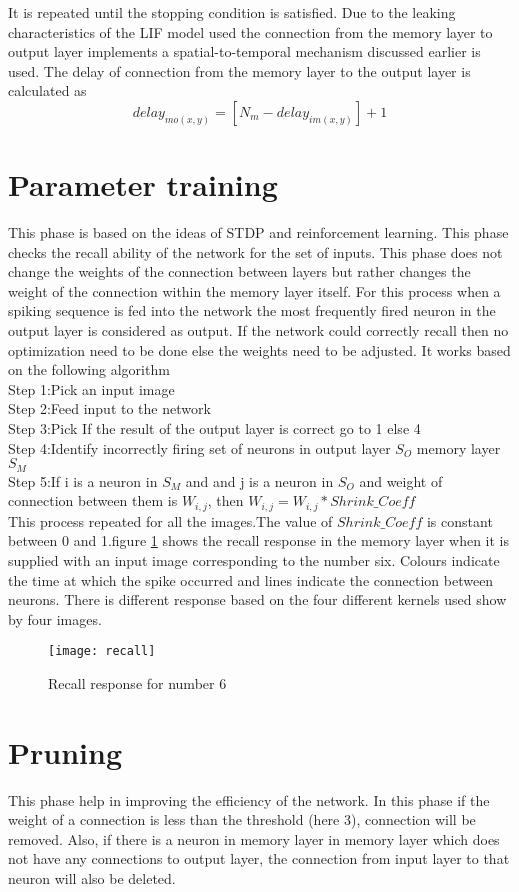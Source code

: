 It is repeated until the stopping condition is satisfied. Due to the leaking
characteristics of the LIF model used the connection from the memory layer to
output layer implements a spatial-to-temporal mechanism discussed earlier is
used. The delay of connection from the memory layer to the output layer is
calculated as
\begin{equation*}
    delay_{mo(x,y)}=[N_m-delay_{im(x,y)}]+1
\end{equation*}
\section{Parameter training}
This phase is based on the ideas of STDP and reinforcement learning. This phase
checks the recall ability of the network for the set of inputs. This phase does
not change the weights of the connection between layers but rather changes the
weight of the connection within the memory layer itself. For this process when
a spiking sequence is fed into the network the most frequently fired neuron in
the output layer is considered as output. If the network could correctly recall
then no optimization need to be done else the weights need to be adjusted. It
works based on the following algorithm \\Step 1:Pick an input image\\ Step
2:Feed input to the network\\ Step 3:Pick If the result of the output layer is
correct go to 1 else 4\\ Step 4:Identify incorrectly firing set of neurons in
output layer $S_{O}$ memory layer $S_{M}$ \\ Step 5:If i is a neuron in $S_M$
and and j is a neuron in $S_O$ and weight of connection between them is
$W_{i,j}$, then $W_{i,j}=W_{i,j}*Shrink\_Coeff$\\ This process repeated for all
the images.The value of $Shrink\_Coeff$ is constant between 0 and 1.figure
\ref{recall} shows the recall response in the memory layer when it is supplied
with an input image corresponding to the number six. Colours indicate the time
at which the spike occurred and lines indicate the connection between neurons.
There is different response based on the four different kernels used show by
four images.
\begin{figure}[h!]
    \centering
    \texttt{[image: recall]}
    \caption{Recall response for number 6}
    \label{recall}
\end{figure}
\section{Pruning}
This phase help in improving the efficiency of the network. In this phase if
the weight of a connection is less than the threshold (here 3), connection will
be removed. Also, if there is a neuron in memory layer in memory layer which
does not have any connections to output layer, the connection from input layer
to that neuron will also be deleted.
